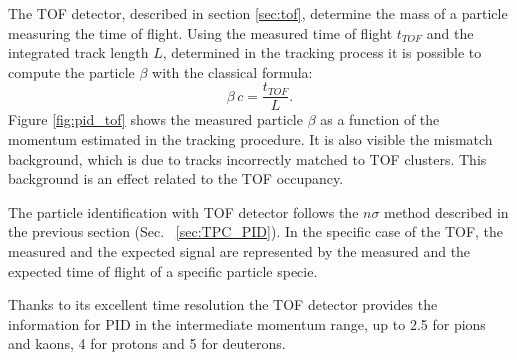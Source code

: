The TOF detector, described in section \ref{sec:tof}, determine the mass of a particle measuring 
the time of flight.
Using the measured time of flight $t_{TOF}$ and the integrated track length $L$, determined in the 
tracking process it is possible to compute the particle $\beta$ with the classical formula:
\begin{equation}
    \beta\,c = \frac{t_{TOF}}{L}.
\end{equation}
Figure \ref{fig:pid_tof} shows the measured particle $\beta$ as a function of the momentum estimated
in the tracking procedure.
It is also visible the mismatch background, which is due to tracks incorrectly matched to TOF
clusters. This background is an effect related to the TOF occupancy.

The particle identification with TOF detector follows the $n\sigma$ method described in the 
previous section (Sec. ~\ref{sec:TPC_PID}). In the specific case of the TOF, the measured and the 
expected signal are represented by the measured and the expected time of flight of a specific
particle specie.

Thanks to its excellent time resolution the TOF detector provides the information for PID in the
intermediate momentum range, up to 2.5 \gevc for pions and kaons, 4 \gevc for protons and 5 \gevc
for deuterons.


 